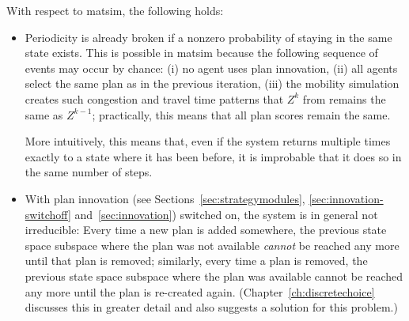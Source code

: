 With respect to \gls{matsim}, the following holds: %
\begin{itemize}

\item Periodicity is already broken if a nonzero probability of staying in
the same state exists. This is possible in \gls{matsim} 
because the following sequence of events may occur by chance:
(i) no agent uses plan innovation,
(ii) all agents select the same plan as in the previous iteration, 
(iii) the mobility simulation creates such congestion and travel time
patterns that $Z^k$ from  remains the same as
$Z^{k-1}$; practically, this means that all plan scores remain the same. 

More intuitively, this means that, even if the system returns multiple times 
exactly to a state where it has been before, 
it is improbable that it does so in the same number of steps. 



\item With plan innovation (see Sections~\ref{sec:strategymodules}, \ref{sec:innovation-switchoff} and~\ref{sec:innovation}) switched on, the system is in general not irreducible:
Every time a new plan is added somewhere, the previous state space subspace where the plan was not available \emph{cannot} be reached any more until that plan is removed; similarly, every time a plan is removed, the previous state space subspace where the plan was available cannot be reached any more until the plan is re-created again. (Chapter~\ref{ch:discretechoice} discusses this in greater detail and also suggests a solution for this problem.)


\end{itemize}
